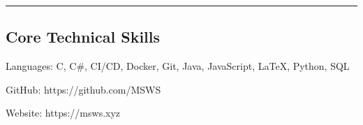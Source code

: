 \documentclass[10pt,letterpaper]{article}
\newenvironment{indentsection}[1]%
{\begin{list}{}%
	{\setlength{\leftmargin}{#1}}%
	\item[]%
}
{\end{list}}
\begin{document}
\hrule
\vspace{-0.4em}
\subsection*{Core Technical Skills}

\begin{indentsection}{\parindent}
    \begin{description*}
        \item[Languages:]
        C, C\#, CI/CD, Docker, Git, Java, JavaScript, \LaTeX, Python, SQL
        \item[GitHub:] https://github.com/MSWS
        \item[Website:] https://msws.xyz
    \end{description*}
\end{indentsection}
\end{document}
